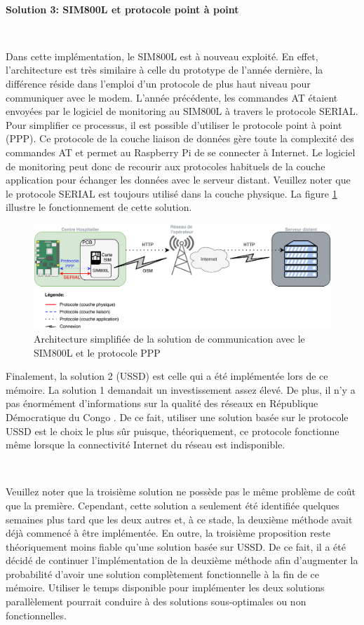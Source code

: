~

\textbf{Solution 3: SIM800L et protocole point à point}

\vspace{-0.2cm}
~

\noindent
Dans cette implémentation, le SIM800L est à nouveau exploité. En effet, l'architecture est très similaire à celle du prototype de l'année dernière, la différence réside dans l'emploi d'un protocole de plus haut niveau pour communiquer avec le modem. L'année précédente, les commandes AT étaient envoyées par le logiciel de monitoring au SIM800L à travers le protocole SERIAL. Pour simplifier ce processus, il est possible d'utiliser le protocole point à point (PPP). Ce protocole de la couche liaison de données gère toute la complexité des commandes AT et permet au Raspberry Pi de se connecter à Internet. Le logiciel de monitoring peut donc de recourir aux protocoles habituels de la couche application pour échanger les données avec le serveur distant. Veuillez noter que le protocole SERIAL est toujours utilisé dans la couche physique. La figure \ref{fig:so2} illustre le fonctionnement de cette solution.


\begin{figure}[ht!]
  \includegraphics[width=\textwidth]{img/el_prototype/solution3_com.png}
  \caption{Architecture simplifiée de la solution de communication avec le SIM800L et le protocole PPP}
  \label{fig:so2}
\end{figure}

\noindent
Finalement, la solution 2 (USSD) est celle qui a été implémentée lors de ce mémoire. La solution 1 demandait un investissement assez élevé. De plus, il n'y a pas énormément d'informations sur la qualité des réseaux en République Démocratique du Congo \cite{congo_tower}. De ce fait, utiliser une solution basée sur le protocole USSD est le choix le plus sûr puisque, théoriquement, ce protocole fonctionne même lorsque la connectivité Internet du réseau est indisponible.

~

\noindent
Veuillez noter que la troisième solution ne possède pas le même problème de coût que la première. Cependant, cette solution a seulement été identifiée quelques semaines plus tard que les deux autres et, à ce stade, la deuxième méthode avait déjà commencé à être implémentée. En outre, la troisième proposition reste théoriquement moins fiable qu'une solution basée sur USSD. De ce fait, il a été décidé de continuer l'implémentation de la deuxième méthode afin d'augmenter la probabilité d'avoir une solution complètement fonctionnelle à la fin de ce mémoire. Utiliser le temps disponible pour implémenter les deux solutions parallèlement pourrait conduire à des solutions sous-optimales ou non fonctionnelles.

